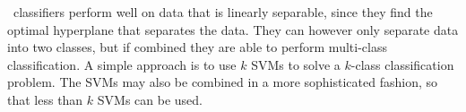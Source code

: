 \svm\ classifiers perform well on data that is linearly separable, since they find the optimal hyperplane that separates the data. They can however only separate data into two classes, but if combined they are able to perform multi-class classification. A simple approach is to use $k$ SVMs to solve a $k$-class classification problem. The SVMs may also be combined in a more sophisticated fashion, so that less than $k$ SVMs can be used. \cite{Mayoras99SVM}